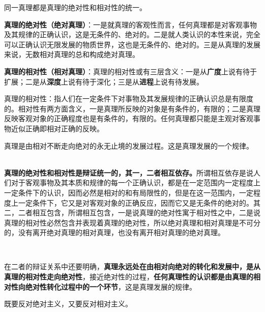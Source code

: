 {同一真理都是真理的绝对性和相对性的统一}。

\textbf{{真理的绝对性（绝对真理）}}：一是就真理的客观性而言，任何真理都是对客观事物及其规律的正确认识，这是无条件的、绝对的。二是就人类认识的本性来说，完全可以正确认识无限发展的物质世界，这也是无条件的、绝对的。三是从真理的发展来说，无数相对真理的总和构成绝对真理。

\textbf{{真理的相对性（相对真理）}}{：真理的相对性或有三层含义：一是从}\textbf{{广度}}{上说有待于扩展；二是从}\textbf{{深度}}{上说有待于深化；三是从}\textbf{{进程}}{上说有待发展。}

{}

真理的相对性：指人们在一定条件下对事物及其发展规律的正确认识总是有限度的。相对性有两方面含义，一是真理所反映的对象是有条件的，有限的；二是真理反映客观对象的正确程度也是有条件的，有限的。任何真理都只能是主观对客观事物近似正确即相对正确的反映。

真理是由相对不断走向绝对的永无止境的发展过程。这是真理发展的一个规律。\\

\textbf{{\\
}}

\textbf{{真理的绝对性和相对性是辩证统一的，其一，二者相互依存。}}所谓相互依存是说人们对于客观事物及其本质和规律的每一个正确认识，都是在一定范围内一定程度上一定条件下的认识，因而必然是相对的和有局限性的，但是在这一范围内，一定程度上一定条件下，它又是对客观对象的正确反应，因而它又是无条件的绝对的。其二，二者相互包含，所谓相互包含，一是说真理的绝对性寓于相对性之中，二是说真理的相对性必然包含并表现着真理的绝对性，所以绝对真理和相对真理是不可分的，没有离开绝对真理的相对真理，也没有离开相对真理的绝对真理。

~

在二者的辩证关系中还要明确，{\textbf{真理永远处在由相对向绝对的转化和发展中，是从真理的相对性走向绝对性}}，接近绝对性的过程，{\textbf{任何真理性的认识都是由真理的相对性向绝对性转化过程中的一个环节}}，这是真理发展的规律。

既要反对绝对主义，又要反对相对主义。
